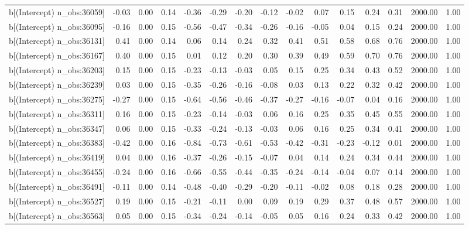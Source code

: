 \begin{table}[ht]
\begin{tabular}{rrrrrrrrrrrrrrr}
  b[(Intercept) n\_obs:36059] & -0.03 & 0.00 & 0.14 & -0.36 & -0.29 & -0.20 & -0.12 & -0.02 & 0.07 & 0.15 & 0.24 & 0.31 & 2000.00 & 1.00 \\ 
  b[(Intercept) n\_obs:36095] & -0.16 & 0.00 & 0.15 & -0.56 & -0.47 & -0.34 & -0.26 & -0.16 & -0.05 & 0.04 & 0.15 & 0.24 & 2000.00 & 1.00 \\ 
  b[(Intercept) n\_obs:36131] & 0.41 & 0.00 & 0.14 & 0.06 & 0.14 & 0.24 & 0.32 & 0.41 & 0.51 & 0.58 & 0.68 & 0.76 & 2000.00 & 1.00 \\ 
  b[(Intercept) n\_obs:36167] & 0.40 & 0.00 & 0.15 & 0.01 & 0.12 & 0.20 & 0.30 & 0.39 & 0.49 & 0.59 & 0.70 & 0.76 & 2000.00 & 1.00 \\ 
  b[(Intercept) n\_obs:36203] & 0.15 & 0.00 & 0.15 & -0.23 & -0.13 & -0.03 & 0.05 & 0.15 & 0.25 & 0.34 & 0.43 & 0.52 & 2000.00 & 1.00 \\ 
  b[(Intercept) n\_obs:36239] & 0.03 & 0.00 & 0.15 & -0.35 & -0.26 & -0.16 & -0.08 & 0.03 & 0.13 & 0.22 & 0.32 & 0.42 & 2000.00 & 1.00 \\ 
  b[(Intercept) n\_obs:36275] & -0.27 & 0.00 & 0.15 & -0.64 & -0.56 & -0.46 & -0.37 & -0.27 & -0.16 & -0.07 & 0.04 & 0.16 & 2000.00 & 1.00 \\ 
  b[(Intercept) n\_obs:36311] & 0.16 & 0.00 & 0.15 & -0.23 & -0.14 & -0.03 & 0.06 & 0.16 & 0.25 & 0.35 & 0.45 & 0.55 & 2000.00 & 1.00 \\ 
  b[(Intercept) n\_obs:36347] & 0.06 & 0.00 & 0.15 & -0.33 & -0.24 & -0.13 & -0.03 & 0.06 & 0.16 & 0.25 & 0.34 & 0.41 & 2000.00 & 1.00 \\ 
  b[(Intercept) n\_obs:36383] & -0.42 & 0.00 & 0.16 & -0.84 & -0.73 & -0.61 & -0.53 & -0.42 & -0.31 & -0.23 & -0.12 & 0.01 & 2000.00 & 1.00 \\ 
  b[(Intercept) n\_obs:36419] & 0.04 & 0.00 & 0.16 & -0.37 & -0.26 & -0.15 & -0.07 & 0.04 & 0.14 & 0.24 & 0.34 & 0.44 & 2000.00 & 1.00 \\ 
  b[(Intercept) n\_obs:36455] & -0.24 & 0.00 & 0.16 & -0.66 & -0.55 & -0.44 & -0.35 & -0.24 & -0.14 & -0.04 & 0.07 & 0.14 & 2000.00 & 1.00 \\ 
  b[(Intercept) n\_obs:36491] & -0.11 & 0.00 & 0.14 & -0.48 & -0.40 & -0.29 & -0.20 & -0.11 & -0.02 & 0.08 & 0.18 & 0.28 & 2000.00 & 1.00 \\ 
  b[(Intercept) n\_obs:36527] & 0.19 & 0.00 & 0.15 & -0.21 & -0.11 & 0.00 & 0.09 & 0.19 & 0.29 & 0.37 & 0.48 & 0.57 & 2000.00 & 1.00 \\ 
  b[(Intercept) n\_obs:36563] & 0.05 & 0.00 & 0.15 & -0.34 & -0.24 & -0.14 & -0.05 & 0.05 & 0.16 & 0.24 & 0.33 & 0.42 & 2000.00 & 1.00 \\ 

\end{tabular}
\end{table}
